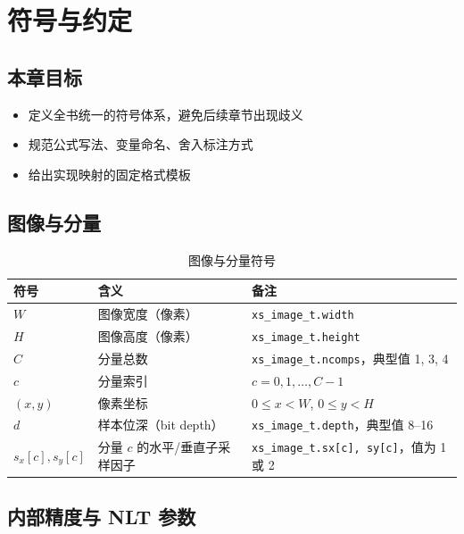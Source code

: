 
\chapter{符号与约定}\label{ch:notation}

\section{本章目标}

\begin{itemize}
  \item 定义全书统一的符号体系，避免后续章节出现歧义
  \item 规范公式写法、变量命名、舍入标注方式
  \item 给出实现映射的固定格式模板
\end{itemize}

\section{图像与分量}

\begin{table}[H]
\centering
\caption{图像与分量符号}
\label{tab:notation-image}
\begin{tabular}{@{}lll@{}}
\toprule
符号 & 含义 & 备注 \\
\midrule
$W$ & 图像宽度（像素） & \texttt{xs\_image\_t.width} \\
$H$ & 图像高度（像素） & \texttt{xs\_image\_t.height} \\
$C$ & 分量总数 & \texttt{xs\_image\_t.ncomps}，典型值 1, 3, 4 \\
$c$ & 分量索引 & $c = 0, 1, \ldots, C-1$ \\
$(x, y)$ & 像素坐标 & $0 \leq x < W$, $0 \leq y < H$ \\
$d$ & 样本位深（bit depth） & \texttt{xs\_image\_t.depth}，典型值 8--16 \\
$s_x[c], s_y[c]$ & 分量 $c$ 的水平/垂直子采样因子 & \texttt{xs\_image\_t.sx[c], sy[c]}，值为 1 或 2 \\
\bottomrule
\end{tabular}
\end{table}

\section{内部精度与 NLT 参数}

